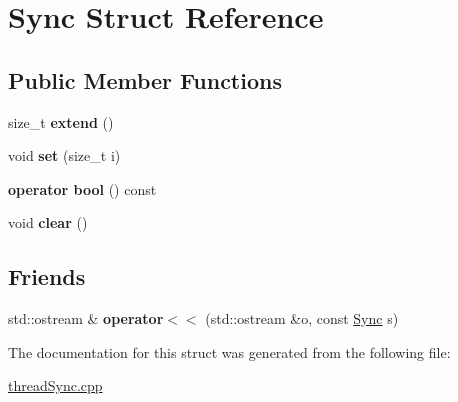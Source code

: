 \hypertarget{structSync}{}\section{Sync Struct Reference}
\label{structSync}
\subsection*{Public Member Functions}
\begin{DoxyCompactItemize}
\item 
size\+\_\+t {\bfseries extend} ()\hypertarget{structSync_a12dd998a8af839e5e5663020f1607863}{}\label{structSync_a12dd998a8af839e5e5663020f1607863}

\item 
void {\bfseries set} (size\+\_\+t i)\hypertarget{structSync_a11ca0966d2a696487fd3eb2c5b85f393}{}\label{structSync_a11ca0966d2a696487fd3eb2c5b85f393}

\item 
{\bfseries operator bool} () const \hypertarget{structSync_a3a6cb3be79398ad788421bea42d90c7a}{}\label{structSync_a3a6cb3be79398ad788421bea42d90c7a}

\item 
void {\bfseries clear} ()\hypertarget{structSync_a41d73e5a06d373973cf50d439e132d11}{}\label{structSync_a41d73e5a06d373973cf50d439e132d11}

\end{DoxyCompactItemize}
\subsection*{Friends}
\begin{DoxyCompactItemize}
\item 
std\+::ostream \& {\bfseries operator$<$$<$} (std\+::ostream \&o, const \hyperlink{structSync}{Sync} s)\hypertarget{structSync_a1f4fd6c9f4d959c189137a370dc24d29}{}\label{structSync_a1f4fd6c9f4d959c189137a370dc24d29}

\end{DoxyCompactItemize}


The documentation for this struct was generated from the following file\+:\begin{DoxyCompactItemize}
\item 
\hyperlink{threadSync_8cpp}{thread\+Sync.\+cpp}\end{DoxyCompactItemize}
